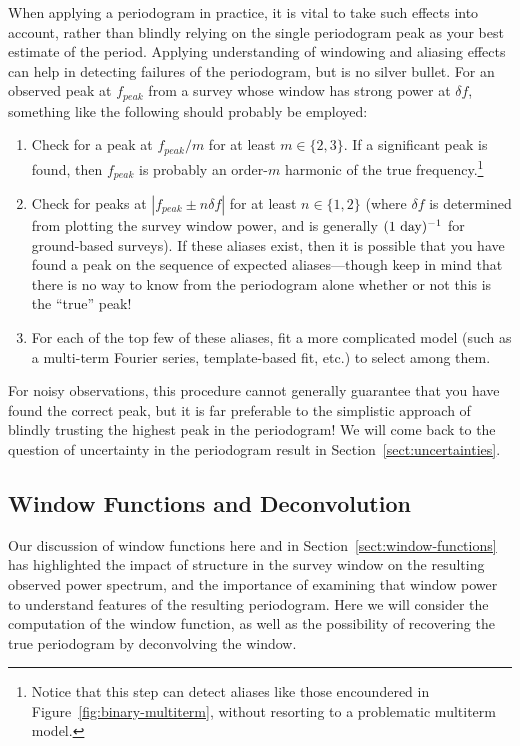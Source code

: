 \documentclass[preprint]{aastex}
\newcommand{\fig}[1]{Figure~\ref{fig:#1}}
\newcommand{\Sect}[1]{Section~\ref{sect:#1}}
\newcommand{\sect}[1]{\Sect{#1}}
\newcommand{\sectlabel}[1]{\label{sect:#1}}
\begin{document}
When applying a periodogram in practice, it is vital to take such effects into
account, rather than blindly relying on the single periodogram peak as your
best estimate of the period.
Applying understanding of windowing and aliasing effects can help in detecting
failures of the periodogram, but is no silver bullet.
For an observed peak at $f_{peak}$ from a survey whose window has strong power
at $\delta f$, something like the following should probably be employed:
\begin{enumerate}
  \item Check for a peak at $f_{peak}/m$ for at least $m \in \{2, 3\}$.
    If a significant peak is found, then $f_{peak}$ is probably an order-$m$
    harmonic of the true frequency.\footnote{Notice that this step can detect
      aliases like those encoundered in \fig{binary-multiterm},
      without resorting to a problematic multiterm model.}
  \item Check for peaks at $|f_{peak} \pm n\delta f|$ for at least
    $n \in \{1, 2\}$ (where $\delta f$ is determined from plotting the survey
    window power, and is generally $(1\ {\rm day})^{-1}$ for ground-based surveys).
    If these aliases exist, then it is possible that you have
    found a peak on the sequence of expected aliases---though keep in mind that
    there is no way to know from the periodogram alone whether or not
    this is the ``true'' peak!
  \item For each of the top few of these aliases, fit a more complicated model
    (such as a multi-term Fourier series, template-based fit, etc.) to select
    among them.
\end{enumerate}
For noisy observations, this procedure cannot generally guarantee that you
have found the correct peak, but it is far preferable to the simplistic
approach of blindly trusting the highest peak in the periodogram!
We will come back to the question of uncertainty in the periodogram result
in \sect{uncertainties}.


\subsection{Window Functions and Deconvolution}
\sectlabel{windows-and-deconvolution}

Our discussion of window functions here and in \sect{window-functions}
has highlighted the impact of structure in the survey window on the
resulting observed power spectrum, and the importance of examining that
window power to understand features of the resulting periodogram.
Here we will consider the computation of the window function, as well
as the possibility of recovering the true periodogram by deconvolving
the window.
\end{document}
